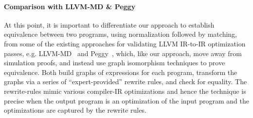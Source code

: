 %            
%            
%            



 

\paragraph{Comparison with LLVM-MD \& Peggy}
At this point, it is important to differentiate our approach to establish 
equivalence between two \LLVM programs, using  normalization followed by 
matching, 
from some of the existing
approaches for validating LLVM IR-to-IR optimization
passes, e.g. LLVM-MD~\cite{Tristan:2011} and Peggy~\cite{Stepp:2011}, which, 
like our approach, move away from simulation proofs, and instead use graph 
isomorphism techniques to prove equivalence. 
Both build graphs of expressions for each program, 
transform the graphs via a series of ``expert-provided'' rewrite rules, and 
check for equality. The rewrite-rules mimic various compiler-IR optimizations 
and hence the technique is precise when the output program is an 
optimization of the input program and the optimizations are captured by the 
rewrite  rules. 

